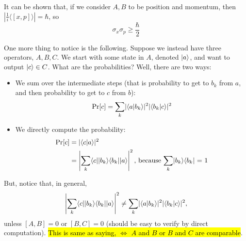 \documentclass[12pt]{article}
\begin{document}
\begin{example}
It can be shown that, if we consider $A,B$ to be position and momentum, then $\left|\frac{1}{i}\langle [x,p] \rangle\right| = \hbar$, so $$
\sigma_x \sigma_p \geq \frac{\hbar}{2}
$$
\end{example}

\begin{remark}
One more thing to notice is the following. Suppose we instead have three operators, $A,B,C$. We start with some state in $A$, denoted $\Ket{a}$, and want to output $\Ket{c}\in C$. What are the probabilities? Well, there are two ways:
\begin{itemize}
    \item We sum over the intermediate steps (that is probability to get to $b_k$ from $a$, and then probability to get to $c$ from $b$): $$
    \Pr[c] = \underset{k}{\sum} |\bk{a}{b_k}|^2|\bk{b_k}{c}|^2
    $$
    \item We directly compute the probability:$$
    \begin{aligned}
    \Pr[c]
        &= |\bk{c}{a}|^2\\
        &= \left|\underset{k}{\sum}\Bra{c}\kb{b_k}{b_k}\Ket{a}\right|^2\text{, because $\underset{k}{\sum}\kb{b_k}{b_k}$ = 1}\\
    \end{aligned}
    $$
\end{itemize}

\noindent But, notice that, in general, $$
\left|\underset{k}{\sum}\Bra{c}\kb{b_k}{b_k}\Ket{a}\right|^2\neq \underset{k}{\sum} |\bk{a}{b_k}|^2|\bk{b_k}{c}|^2,
$$ unless $[A,B] = 0$ or $[B,C] = 0$ (should be easy to verify by direct computation). \hl{This is same as saying, $\iff$ $A$ and $B$ or $B$ and $C$ are comparable}.
\end{remark}
\end{document}
